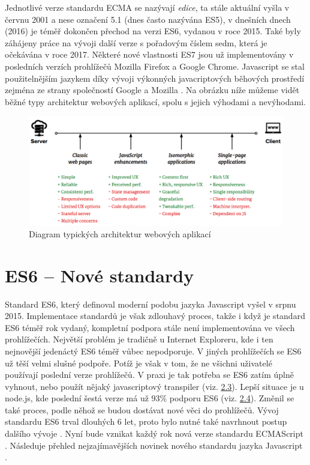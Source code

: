 Jednotlivé verze standardu ECMA se nazývají \textit{edice}, ta stále aktuální vyšla v červnu 2001 a nese označení 5.1 (dnes často nazývána ES5), v dnešních dnech (2016) je téměř dokončen přechod na verzi ES6, vydanou v roce 2015. Také byly záhájeny práce na vývoji další verze s pořadovým číslem sedm, která je očekávána v roce 2017. Některé nové vlastnosti ES7 jsou už implementovány v posledních verzích prohlížečů Mozilla Firefox a Google Chrome. Javascript se stal použitelnějším jazykem díky vývoji výkonných javacriptových běhových prostředí zejména ze strany společností Google a Mozilla \cite{hronek_javascript} \cite{ecmascript}. 
Na obrázku níže můžeme vidět běžné typy architektur webových aplikací, spolu s jejich výhodami a nevýhodami.
\begin{figure}[h]
\begin{centering}
\includegraphics[scale=0.4]{obrazky/websites}
\par\end{centering}
\caption{Diagram typických architektur webových aplikací \cite{codepicnic_universaljs} \label{fig:typical-web-arch-diagram}}
\end{figure}
\FloatBarrier

\section{ES6 – Nové standardy}
Standard ES6, který definoval moderní podobu jazyka Javascript vyšel v srpnu 2015. Implementace standardů je však zdlouhavý proces, takže i když je standard ES6 téměř rok vydaný, kompletní podpora stále není implementována ve všech prohlížečích. Největší problém je tradičně u Internet Exploreru, kde i ten nejnovější jedenáctý ES6 téměř vůbec nepodporuje. V jiných prohlížečích se ES6 už těší velmi slušné podpoře. Potíž je však v tom, že ne všichni uživatelé používají poslední verze prohlížečů. V praxi je tak potřeba se ES6 zatím úplně vyhnout, nebo použít nějaký javascriptový transpiler (viz. \hyperref[sec:js_transpilers]{2.3}). Lepší situace je u node.js, kde poslední šestá verze má už 93\% podporu ES6 (viz. \hyperref[sec:node_js]{2.4}). Změnil se také proces, podle něhož se budou dostávat nové věci do prohlížečů. Vývoj standardu ES6 trval dlouhých 6 let, proto bylo nutné také navrhnout postup dalšího vývoje \cite{exploring_es6}. Nyní bude vznikat každý rok nová verze standardu ECMAScript \cite{tc39ecma}. Následuje přehled nejzajímavějších novinek nového standardu jazyka Javascript \cite{exploring_es6}.

